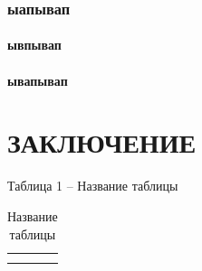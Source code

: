 \documentclass[paper=a4, fontsize=14pt, pagesize, DIV=calc, oneside]{scrreport}
\begin{document}
\subsection{ыапывап}














\subsubsection{ывпывап}












\subsubsection{ывапывап}




\chapter*{ЗАКЛЮЧЕНИЕ}











Таблица 1 – Название таблицы


\begin{table}[htbp]
    \caption{ Название таблицы }
    \label{tab:table-549f0a69-a9f3-4c4a-a91f-1a9ee6b39ce5}
    \begin{tabularx}{\textwidth}{ |X|X|X| }
        \toprule
         &  &  \\
        \midrule
         &  &  \\
         &  &  \\
        \bottomrule
    \end{tabularx}
\end{table}


\newpage
\printbibliography[heading=bibintoc, title={Список использованных источников}]
\end{document}
